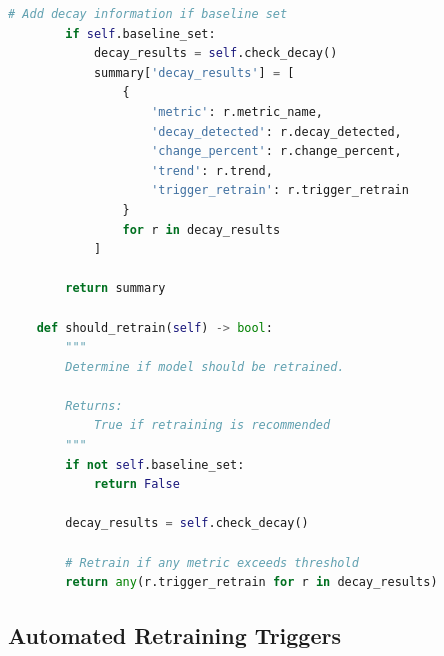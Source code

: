 \begin{lstlisting}[language=Python, caption={Performance Tracking with Decay Detection}]
        # Add decay information if baseline set
        if self.baseline_set:
            decay_results = self.check_decay()
            summary['decay_results'] = [
                {
                    'metric': r.metric_name,
                    'decay_detected': r.decay_detected,
                    'change_percent': r.change_percent,
                    'trend': r.trend,
                    'trigger_retrain': r.trigger_retrain
                }
                for r in decay_results
            ]

        return summary

    def should_retrain(self) -> bool:
        """
        Determine if model should be retrained.

        Returns:
            True if retraining is recommended
        """
        if not self.baseline_set:
            return False

        decay_results = self.check_decay()

        # Retrain if any metric exceeds threshold
        return any(r.trigger_retrain for r in decay_results)
\end{lstlisting}

\subsection{Automated Retraining Triggers}

